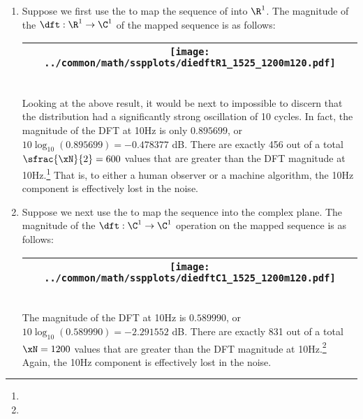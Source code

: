 \begin{example}
\begin{enumerate}
  \item \label{item:nonstat34_R1pam}
        Suppose we first use the   to map
        the sequence of  into $\R^1$.
        The magnitude of the $\dft:\R^1\to\C^1$ of the mapped sequence is as follows:
     \\\begin{tabular}{|>{\scs}c|}
          \hline
          \texttt{[image: ../common/math/sspplots/diedftR1\_1525\_1200m120.pdf]}%
        \\\hline
     \end{tabular}\\
     Looking at the above result, it would be next to impossible to discern that the distribution had a significantly strong
     oscillation of 10 cycles.
     In fact, the magnitude of the DFT at 10Hz is only $0.895699$, or $10\log_{10}(0.895699)=-0.478377$ dB.
     There are exactly 456 out of a total $\sfrac{\xN}{2}=600$ values that are greater than 
     the DFT magnitude at 10Hz.\footnote{}
     That is, to either a human observer or a machine algorithm, the 10Hz component is effectively lost in the noise.
     
  \item \label{item:nonstat34_C1qpsk}
    Suppose we next use the   to map
    the sequence into the complex plane.
    The magnitude of the $\dft:\C^1\to\C^1$ operation on the mapped sequence is as follows:
    \\\begin{tabular}{|>{\scs}c|}
         \hline
         \texttt{[image: ../common/math/sspplots/diedftC1\_1525\_1200m120.pdf]}%
       \\\hline
    \end{tabular}\\
    The magnitude of the DFT at 10Hz is $0.589990$, or $10\log_{10}(0.589990)=-2.291552$ dB.
    There are exactly 831 out of a total $\xN=1200$ values that are greater than 
    the DFT magnitude at 10Hz.\footnote{}
    Again, the 10Hz component is effectively lost in the noise.
     

\end{enumerate}
\end{example}
